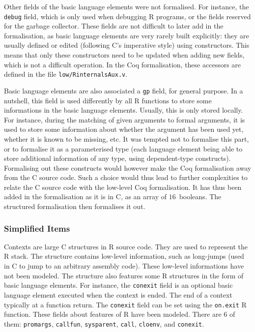 \documentclass{article}
\newcommand\Coq{Coq}
\newcommand\R{R}
\newcommand\Cn{C}
\begin{document}
Other fields of the basic language elements were not formalised.
For instance, the \texttt{debug} field,
which is only used when debugging \R{} programs,
or the fields reserved for the garbage collector.
These fields are not difficult to later add in the formalisation,
as basic language elements are very rarely built explicitly:
they are usually defined or edited (following \Cn{}'s imperative style)
using constructors.
This means that only these constructors need to be updated
when adding new fields,
which is not a difficult operation.
In the \Coq{} formalisation, these accessors are defined in the file
\texttt{low/RinternalsAux.v}.

Basic language elements are also associated a \texttt{gp} field,
for general purpose.
In a nutshell, this field is used differently by all \R{} functions
to store some informations in the basic language elements.
Usually, this is only stored locally.
For instance, during the matching of given arguments to formal arguments,
it is used to store some information about whether the argument
has been used yet, whether it is known to be missing, etc.
It was tempted not to formalise this part,
or to formalise it as a parameterised type
(each language element being able to store additional information
of any type, using dependent-type constructs).
Formalising out these constructs would however make the \Coq{}
formalisation away from the \Cn{} source code.
Such a choice would thus lead to further complexities to relate
the \Cn{} source code with the low-level \Coq{} formalisation.
It has thus been added in the formalisation as it is in \Cn{},
as an array of \(16\)~booleans.
The structured formalisation then formalises it out.


\subsubsection{Simplified Items}
\label{sec:coverage:simplifications}

Contexts are large \Cn{} structures in \R{} source code.
They are used to represent the \R{} stack.
The structure contains low-level information,
such as long-jumps
(used in \Cn{} to jump to an arbitrary assembly code).
These low-level informations have not been modeled.
The structure also features some \R{} structures
in the form of basic language elements.
For instance, the \texttt{conexit} field
is an optional basic language element executed when
the context is ended.
The end of a context typically at a function return.
The \texttt{conexit} field can be set
using the \texttt{on.exit} \R{} function.
These fields about features of \R{} have been modeled.
There are \(6\) of them:
\texttt{promargs},
\texttt{callfun},
\texttt{sysparent},
\texttt{call},
\texttt{cloenv}, and
\texttt{conexit}.
\end{document}
